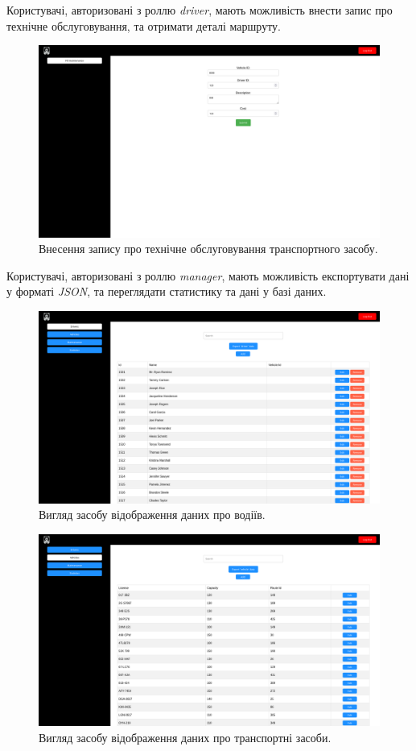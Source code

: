 \documentclass[oneside,14pt]{extarticle}
\begin{document}
Користувачі, авторизовані з роллю \textit{driver}, мають можливість внести запис про технічне обслуговування, та отримати деталі маршруту.

\begin{figure}[H]
\centering
\includegraphics[scale=0.25]{5}
\caption{Внесення запису про технічне обслуговування транспортного засобу.}
\end{figure}

Користувачі, авторизовані з роллю \textit{manager}, мають можливість експортувати дані у форматі \textit{JSON}, та переглядати статистику та дані у базі даних.

\begin{figure}[H]
\centering
\includegraphics[scale=0.3]{6}
\caption{Вигляд засобу відображення даних про водіїв.}
\end{figure}

\begin{figure}[H]
	\centering
	\includegraphics[scale=0.3]{7}
	\caption{Вигляд засобу відображення даних про транспортні засоби.}
\end{figure}
\end{document}

